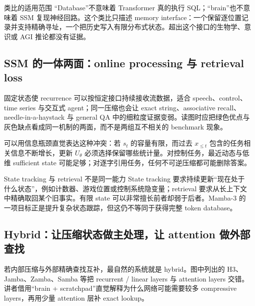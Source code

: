 \begin{warningbox}{类比的适用范围}
“Database”不意味着 Transformer 真的执行 SQL；“brain”也不意味着 SSM 复现神经回路。这个类比只描述 memory interface：一个保留逐位置记录并支持精确寻址，一个把历史写入有限分布式状态。超出这个接口的生物学、意识或 AGI 推论都没有证据。
\end{warningbox}

\subsection{SSM 的一体两面：online processing 与 retrieval loss}

固定状态使 recurrence 可以按恒定接口持续接收流数据，适合 speech、control、time series 与交互式 agent；同一压缩也会让 exact string、associative recall、needle-in-a-haystack 与 general QA 中的细粒度证据变弱。读图时应把绿色优点与灰色缺点看成同一机制的两面，而不是两组互不相关的 benchmark 现象。


可以用信息瓶颈直觉表达这种冲突：若 $s_t$ 的容量有限，而过去 $x_{\le t}$ 包含的任务相关信息不断增长，更新 $U_\theta$ 必须选择保留哪些统计量。对控制任务，最近动态与低维 sufficient state 可能足够；对逐字引用任务，任何不可逆压缩都可能删除答案。

\begin{knowledgebox}{State tracking 与 retrieval 不是同一能力}
State tracking 要求持续更新“现在处于什么状态”，例如计数器、游戏位置或控制系统隐变量；retrieval 要求从长上下文中精确取回某个旧事实。有限 state 可以非常擅长前者却弱于后者。Mamba-3 的一项目标正是提升复杂状态跟踪，但这仍不等同于获得完整 token database。
\end{knowledgebox}

\subsection{Hybrid：让压缩状态做主处理，让 attention 做外部查找}

若内部压缩与外部精确查找互补，最自然的系统就是 hybrid。图中列出的 H3、Jamba、Zamba、Samba 等把 recurrent / linear layers 与 attention layers 交错。讲者借用“brain + scratchpad”直觉解释为什么网络可能需要较多 compressive layers，再用少量 attention 层补 exact lookup。


